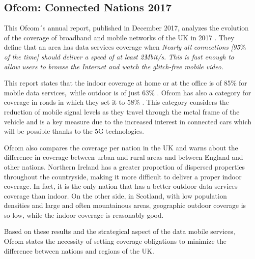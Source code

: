 \subsection*{Ofcom: Connected Nations 2017}
This Ofcom´s annual report, published in December 2017, analyzes the evolution of the coverage of broadband and mobile networks of the UK in 2017 \cite{1-32}. They define that an area has data services coverage when \guillemotleft \textit{Nearly all connections [95$\%$  of the time] should deliver a speed of at least 2Mbit/s. This is fast enough to allow users to browse the Internet and watch the glitch-free mobile video\guillemotright .}\par

This report states that the indoor coverage at home or at the office is of 85$\%$  for mobile data services,\ while outdoor is of just 63$\%$ .  Ofcom has also a category for coverage in roads in which they set it to 58$\%$ . This category considers the reduction of mobile signal levels as they travel through the metal frame of the vehicle and is a key measure due to the increased interest in connected cars which will be possible thanks to the 5G technologies.\par

Ofcom also compares the coverage per nation in the UK and warns about the difference in coverage between urban and rural areas and between England and other nations. Northern Ireland has a greater proportion of dispersed properties throughout the countryside, making it more difficult to deliver a proper indoor coverage. In fact, it is the only nation that has a better outdoor data services coverage than indoor. On the other side, in Scotland, with low population densities and large and often mountainous areas, geographic outdoor coverage is so low, while the indoor coverage is reasonably good. \par

Based on these results and the strategical aspect of the data mobile services, Ofcom states the necessity of setting coverage obligations to minimize the difference between nations and regions of the UK.





